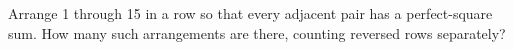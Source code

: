 Arrange 1 through 15 in a row so that every adjacent pair has a perfect-square sum. How many such arrangements are there, counting reversed rows separately?
